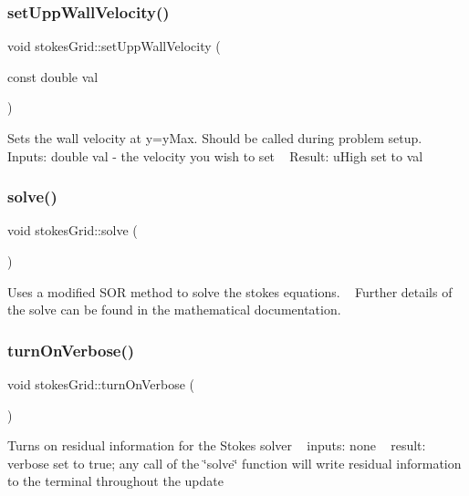 \subsubsection{\texorpdfstring{set\+Upp\+Wall\+Velocity()}{setUppWallVelocity()}}
{\footnotesize\ttfamily void stokes\+Grid\+::set\+Upp\+Wall\+Velocity (\begin{DoxyParamCaption}\item[{const double}]{val }\end{DoxyParamCaption})}

Sets the wall velocity at y=y\+Max. Should be called during problem setup. ~\newline
Inputs\+: double val -\/ the velocity you wish to set ~\newline
Result\+: u\+High set to val \mbox{\label{classstokesGrid_ae85a3fe6aebbee5d78b574065e018d55}} 
\subsubsection{\texorpdfstring{solve()}{solve()}}
{\footnotesize\ttfamily void stokes\+Grid\+::solve (\begin{DoxyParamCaption}{ }\end{DoxyParamCaption})}

Uses a modified S\+OR method to solve the stokes equations. ~\newline
Further details of the solve can be found in the mathematical documentation. \mbox{\label{classstokesGrid_a30a88cab7520df88c110c9f1acd57682}} 
\subsubsection{\texorpdfstring{turn\+On\+Verbose()}{turnOnVerbose()}}
{\footnotesize\ttfamily void stokes\+Grid\+::turn\+On\+Verbose (\begin{DoxyParamCaption}{ }\end{DoxyParamCaption})}

Turns on residual information for the Stokes solver ~\newline
inputs\+: none ~\newline
result\+: verbose set to true; any call of the \char`\"{}solve\char`\"{} function will write residual information to the terminal throughout the update \mbox{\label{classstokesGrid_ac25f2161d1c4faf8065e77e8600d513c}} 
